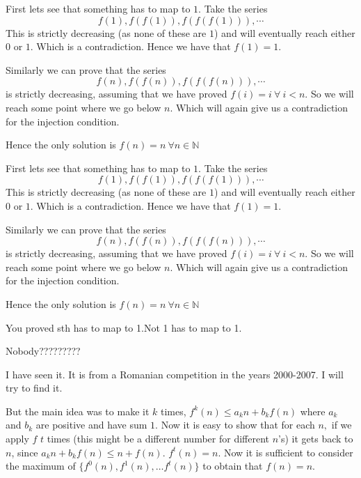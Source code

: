 \begin{solution}
	First lets see that something has to map to $1$.
Take the series
\[ f(1), f(f(1)), f(f(f(1))), \cdots \]
This is strictly decreasing (as none of these are $1$) and will eventually reach either $0$ or $1$.
Which is a contradiction.
Hence we have that $f(1)=1$.

Similarly we can prove that the series 
\[ f(n), f(f(n)), f(f(f(n))), \cdots\]
is strictly decreasing, assuming that we have proved $f(i)=i~\forall~i<n$.
So we will reach some point where we go below $n$.
Which will again give us a contradiction for the injection condition.

Hence the only solution is $f(n)=n~\forall n\in\mathbb{N}$

\end{solution}



\begin{solution}
	\begin{tcolorbox}First lets see that something has to map to $1$.
Take the series
\[ f(1), f(f(1)), f(f(f(1))), \cdots \]
This is strictly decreasing (as none of these are $1$) and will eventually reach either $0$ or $1$.
Which is a contradiction.
Hence we have that $f(1)=1$.

Similarly we can prove that the series 
\[ f(n), f(f(n)), f(f(f(n))), \cdots\]
is strictly decreasing, assuming that we have proved $f(i)=i~\forall~i<n$.
So we will reach some point where we go below $n$.
Which will again give us a contradiction for the injection condition.

Hence the only solution is $f(n)=n~\forall n\in\mathbb{N}$\end{tcolorbox}

You proved sth has to map to 1.Not 1 has to map to 1.
\end{solution}



\begin{solution}
	Nobody?????????
\end{solution}



\begin{solution}
	I have seen it. It is from a Romanian competition in the years 2000-2007. I will try to find it.

But the main idea was to make it $k$ times, $f^k(n)\le a_kn+b_kf(n)$ where  $a_k$ and $b_k$ are positive and have sum $1$. Now it is easy to show that for each $n,$ if we apply $f$ $t$ times (this might be a different number for different $n$'s) it gets back to $n$, since $a_kn + b_kf(n)\le n+f(n)$. $f^t(n)=n$.
Now it is sufficient to consider the maximum of $\{f^0(n),f^1(n),\ldots f^t(n)\}$ to obtain that $f(n)=n$.
\end{solution}



